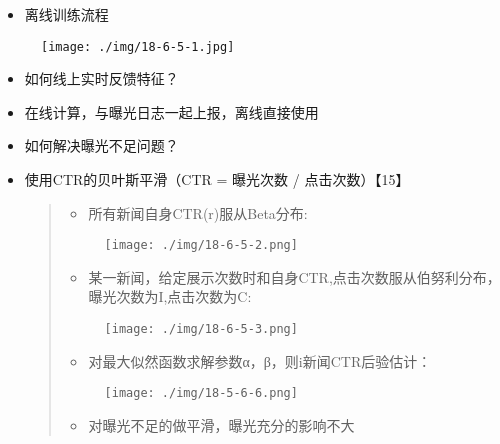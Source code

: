 \begin{itemize}
\item
  离线训练流程
\end{itemize}

\begin{figure}
\centering
\texttt{[image: ./img/18-6-5-1.jpg]}
\caption{}
\end{figure}

\begin{itemize}
\item
  如何线上实时反馈特征？
\item
  在线计算，与曝光日志一起上报，离线直接使用
\item
  如何解决曝光不足问题？
\item
  使用CTR的贝叶斯平滑（CTR = 曝光次数 / 点击次数）【15】

  \begin{quote}
  \begin{itemize}
  \item
    所有新闻自身CTR(r)服从Beta分布:
  \end{itemize}

  \begin{figure}
  \centering
  \texttt{[image: ./img/18-6-5-2.png]}
  \caption{}
  \end{figure}

  \begin{itemize}
  \item
    某一新闻，给定展示次数时和自身CTR,点击次数服从伯努利分布，曝光次数为I,点击次数为C:
  \end{itemize}

  \begin{figure}
  \centering
  \texttt{[image: ./img/18-6-5-3.png]}
  \caption{}
  \end{figure}

  \begin{itemize}
  \item
    对最大似然函数求解参数α，β，则i新闻CTR后验估计：
  \end{itemize}

  \begin{figure}
  \centering
  \texttt{[image: ./img/18-5-6-6.png]}
  \caption{}
  \end{figure}

  \begin{itemize}
  \item
    对曝光不足的做平滑，曝光充分的影响不大
  \end{itemize}
  \end{quote}
\end{itemize}

